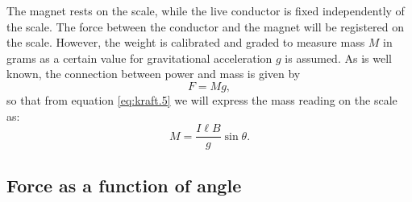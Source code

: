 \documentclass[../Elmag-labhefte-2020.tex]{subfiles}
\begin{document}
The magnet rests on the scale, while the live conductor is fixed independently of the scale. The force between the conductor and the magnet will be registered on the scale. However, the weight is calibrated and graded to measure mass $M$ in grams as a certain value for gravitational acceleration $g$ is assumed. As is well known, the connection between power and mass is given by
\begin{equation}
    F = M g, 
    \label{eq:kraft.7}
\end{equation}
so that from equation \eqref{eq:kraft.5} we will express the mass reading on the scale as:
\begin{equation}
    M = \frac{I \ell B}{g} \sin \theta.
    \label{eq:kraft.8}
\end{equation}






\subsection{Force as a function of angle \label{ch.kraft.beregn3}}
\end{document}

